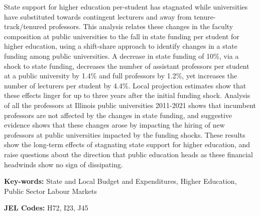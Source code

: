 \noindent
State support for higher education per-student has stagnated while universities have substituted towards contingent lecturers and away from tenure-track/tenured professors.
This analysis relates these changes in the faculty composition at public universities to the fall in state funding per student for higher education, using a shift-share approach to identify changes in a state funding among public universities.
A decrease in state funding of 10\%, via a shock to state funding, decreases the number of assistant professors per student at a public university by 1.4\% and full professors by 1.2\%, yet increases the number of lecturers per student by 4.4\%.
Local projection estimates show that these effects linger for up to three years after the initial funding shock.
Analysis of all the professors at Illinois public universities 2011-2021 shows that incumbent professors are not affected by the changes in state funding, and suggestive evidence shows that these changes arose by impacting the hiring of new professors at public universities impacted by the funding shocks.
These results show the long-term effects of stagnating state support for higher education, and raise questions about the direction that public education heads as these financial headwinds show no sign of dissipating.

\vfill
\noindent
\textbf{Key-words:}
State and Local Budget and Expenditures,
Higher Education,
Public Sector Labour Markets

\vspace{0.1cm}
\noindent
\textbf{JEL Codes:} H72, I23, J45
